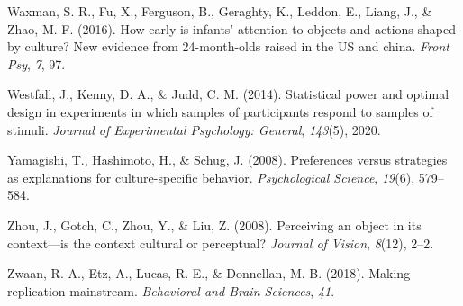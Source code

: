 \documentclass[
  man]{apa6}
\newlength{\cslhangindent}
\newlength{\cslentryspacingunit} %
\newenvironment{CSLReferences}[2] %
 {%
  \setlength{\parindent}{0pt}
  \ifodd #1
  \let\oldpar\par
  \def\par{\hangindent=\cslhangindent\oldpar}
  \fi
  \setlength{\parskip}{#2\cslentryspacingunit}
 }%
 {}
\begin{document}
\begin{CSLReferences}{1}{0}
\leavevmode{}%
Waxman, S. R., Fu, X., Ferguson, B., Geraghty, K., Leddon, E., Liang, J., \& Zhao, M.-F. (2016). How early is infants' attention to objects and actions shaped by culture? New evidence from 24-month-olds raised in the US and china. \emph{Front Psy}, \emph{7}, 97.

\leavevmode{}%
Westfall, J., Kenny, D. A., \& Judd, C. M. (2014). Statistical power and optimal design in experiments in which samples of participants respond to samples of stimuli. \emph{Journal of Experimental Psychology: General}, \emph{143}(5), 2020.

\leavevmode{}%
Yamagishi, T., Hashimoto, H., \& Schug, J. (2008). Preferences versus strategies as explanations for culture-specific behavior. \emph{Psychological Science}, \emph{19}(6), 579--584.

\leavevmode{}%
Zhou, J., Gotch, C., Zhou, Y., \& Liu, Z. (2008). Perceiving an object in its context---is the context cultural or perceptual? \emph{Journal of Vision}, \emph{8}(12), 2--2.

\leavevmode{}%
Zwaan, R. A., Etz, A., Lucas, R. E., \& Donnellan, M. B. (2018). Making replication mainstream. \emph{Behavioral and Brain Sciences}, \emph{41}.

\end{CSLReferences}
\end{document}
